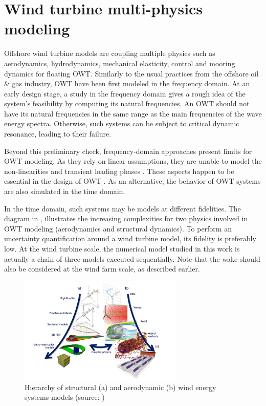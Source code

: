 \section{Wind turbine multi-physics modeling} \label{sec:owt_modeling}

Offshore wind turbine models are coupling multiple physics such as aerodynamics, hydrodynamics, mechanical elasticity, control and mooring dynamics for floating OWT. 
Similarly to the usual practices from the offshore oil \& gas industry, OWT have been first modeled in the frequency domain. 
At an early design stage, a study in the frequency domain gives a rough idea of the system's feasibility by computing its natural frequencies. 
An OWT should not have its natural frequencies in the same range as the main frequencies of the wave energy spectra. 
Otherwise, such systems can be subject to critical dynamic resonance, leading to their failure.

Beyond this preliminary check, frequency-domain approaches present limits for OWT modeling. 
As they rely on linear assumptions, they are unable to model the non-linearities and transient loading phases \citep{matha_2011_ISOPE}. 
These aspects happen to be essential in the design of OWT \citep{jonkman_2011_ISOPE}. 
As an alternative, the behavior of OWT systems are also simulated in the time domain. 

In the time domain, such systems may be models at different fidelities. 
The diagram in , illustrates the increasing complexities for two physics involved in OWT modeling (aerodynamics and structural dynamics). 
To perform an uncertainty quantification around a wind turbine model, its fidelity is preferably low. 
At the wind turbine scale, the numerical model studied in this work is actually a chain of three models executed sequentially. 
Note that the wake should also be considered at the wind farm scale, as described earlier. 

\begin{figure}
    \centering
    \includegraphics[width=0.7\textwidth]{./part1/figures/OWT_modeling_fidelities.png}
    \caption{Hierarchy of structural (a) and aerodynamic (b) wind energy systems models (source: \citet{veers_2019_review})}
    \label{fig:owt_modeling_fidelities}
\end{figure}

